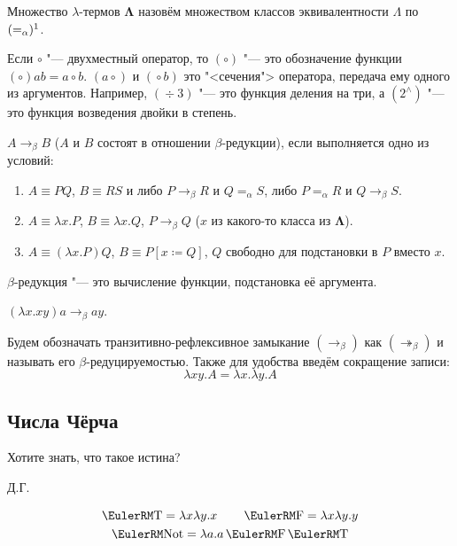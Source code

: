 \begin{definition}
    Множество $\lambda$-термов $\boldsymbol{\Lambda}$ назовём множеством классов эквивалентности $\Lambda$ по $(=_{\alpha})\footnotemark$.
\end{definition}
\footnotetext
{Если $\circ$ "--- двухместный оператор, то $\left(\circ\right)$ "--- это обозначение функции $\left(\circ\right) a b = a \circ b$.
$\left(a \operatorname{\circ}\right)$ и $\left(\operatorname\circ b\right)$ это "<сечения"> оператора, передача ему одного из аргументов.
Например, $\left(\operatorname\div 3\right)$ "--- это функция деления на три,
а $\left(2^\wedge\right)$ "--- это функция возведения двойки в степень.}

\begin{definition}
    $A\to_{\beta}B$ ($A$ и $B$ состоят в отношении $\beta$-редукции), если выполняется одно из условий:
    \begin{enumerate}
        \item $A\equiv{}PQ$, $B\equiv{}RS$ и либо $P\to_{\beta}R$ и $Q=_{\alpha}S$,
            либо $P=_{\alpha}R$ и $Q\to_{\beta}S$.
        \item $A\equiv{}\lambda{}x.P$, $B\equiv{}\lambda x.Q$, $P\to_{\beta}Q$ ($x$ из какого-то класса из $\boldsymbol{\Lambda}$).
        \item $A\equiv{}(\lambda{}x.P)Q$, $B\equiv{}P [x\coloneqq{}Q]$, $Q$ свободно для подстановки в $P$ вместо $x$.
    \end{enumerate}
\end{definition}

$\beta$-редукция "--- это вычисление функции, подстановка её аргумента.

\begin{example} $(\lambda x . x y) a \to_\beta a y$.
\end{example}

Будем обозначать транзитивно-рефлексивное замыкание $\left(\to_\beta\right)$ как $\left(\twoheadrightarrow_{\beta}\right)$
и называть его $\beta$-редуцируемостью.
Также для удобства введём сокращение записи:
\[
    \lambda x y . A = \lambda x . \lambda y . A
\]


\subsection{\texorpdfstring{Числа Чёрча}{Church numerals}}
\epigraph{Хотите знать, что такое истина?}{Д.Г.}

\newcommand{\T}{\func{T}}
\newcommand{\F}{\func{F}}
\newcommand{\Not}{\func{Not}}
\begin{gather*}
    \T   = \lambda{}x\lambda{}y.x \qquad
    \F   = \lambda{}x\lambda{}y.y \\
    \Not = \lambda{}a.a\F\T
\end{gather*}

